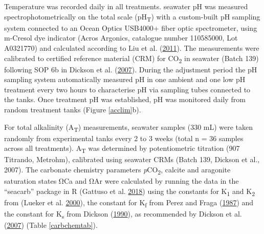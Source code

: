 \documentclass[a4paper,10pt, oneside]{memoir}
\begin{document}
Temperature was recorded daily in all treatments.
seawater pH was measured spectrophotometrically on the total scale (\si{pH_T}) with a custom-built pH sampling system connected to an Ocean Optics USB4000+ fiber optic spectrometer, using m-Cresol dye indicator (Acros Argonics, catalogue number 110585000, Lot A0321770) and calculated according to Liu et al. (\protect\hyperlink{ref-Liu2011}{2011}).
The measurements were calibrated to certified reference material (CRM) for CO\textsubscript{2} in seawater (Batch 139) following SOP 6b in Dickson et al. (\protect\hyperlink{ref-Dickson2007}{2007}).
During the adjustment period the pH sampling system automatically measured pH in one ambient and one low pH treatment every two hours to characterise pH via sampling tubes connected to the tanks.
Once treatment pH was established, pH was monitored daily from random treatment tanks (Figure \ref{acclim}b).

For total alkalinity (A\textsubscript{T}) measurements, seawater samples (330 mL) were taken randomly from experimental tanks every 2 to 3 weeks (total n = 36 samples across all treatments).
A\textsubscript{T} was determined by potentiometric titration (907 Titrando, Metrohm), calibrated using seawater CRMs (Batch 139, Dickson et al., 2007).
The carbonate chemistry parameters \textit{p}CO\textsubscript{2}, calcite and aragonite saturation states \si{\ohm}Ca and \si{\ohm}Ar were calculated by running the data in the ``seacarb'' package in R (Gattuso et al. \protect\hyperlink{ref-Gattuso2018}{2018}) using the constants for K\textsubscript{1} and K\textsubscript{2} from (Lueker et al. \protect\hyperlink{ref-Lueker2000}{2000}), the constant for K\textsubscript{f} from Perez and Fraga (\protect\hyperlink{ref-Perez1987}{1987}) and the constant for K\textsubscript{s} from Dickson (\protect\hyperlink{ref-Dickson1990}{1990}), as recommended by Dickson et al. (\protect\hyperlink{ref-Dickson2007}{2007}) (Table \ref{carbchemtab}).
\end{document}
